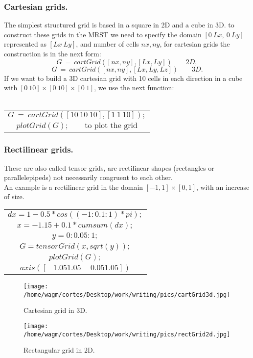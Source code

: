 \documentclass[a4paper,10pt]{report}
\begin{document}
\subsubsection{Cartesian grids.}
The simplest structured grid is based in a square in 2D and a cube in 3D. to construct these
grids in the MRST we need to specify the domain $[0\: Lx,\: 0\: Ly]$ represented as $[Lx\: Ly]$, and
number of cells $nx, ny$, for cartesian grids the construction is in the next form:\\
$$
G\:=\:cartGrid([nx,ny],[Lx,Ly]) \qquad 2D, $$
$$G\:=\:cartGrid([nx,ny],[Lx,Ly,Lz]) \qquad 3D.
$$
If we want to build a 3D cartesian grid with 10 cells in each direction in a cube with 
$ [0\: 10]\times [0\: 10]\times[0\: 1]$, we use the next function:\\\\
\begin{tabular}{|c|}
\hline
$$
G\:=\:cartGrid([10 \:10\: 10],[1\: 1\: 10]); $$\\
$$plotGrid(G);   \qquad \text{to plot the grid}$$\\
\hline
\end{tabular}


\subsubsection{Rectilinear grids.}
These are also called tensor grids, are rectilinear shapes (rectangles or parallelepipeds) not necessarily 
congruent to each other.\\
An example is a rectilinear grid in the domain $[-1,1]\times[0,1]$, with an increase of size.

\begin{tabular}{|l|}
\hline
 $$dx=1-0.5*cos((-1:0.1:1)*pi);$$ \\
 $$x=-1.15+0.1*cumsum(dx);$$\\
 $$y=0:0.05:1;$$\\
 $$G=tensorGrid(x,sqrt(y));$$\\
 $$plotGrid(G);$$\\
 $$axis([-1.05 1.05 -0.05 1.05])$$\\
\hline
\end{tabular}
\begin{figure}[h!]
\centering
\begin{minipage}{.6\textwidth}
 \centering
\texttt{[image: /home/wagm/cortes/Desktop/work/writing/pics/cartGrid3d.jpg]}
\caption{Cartesian grid in 3D.}
\label{fig:Cartgrid3D}
\end{minipage}%
\begin{minipage}{.5\textwidth}
\centering
\texttt{[image: /home/wagm/cortes/Desktop/work/writing/pics/rectGrid2d.jpg]}
\caption{Rectangular grid in 2D.}
\label{fig:Rectgrid2D}
\end{minipage}
\end{figure}
\end{document}
